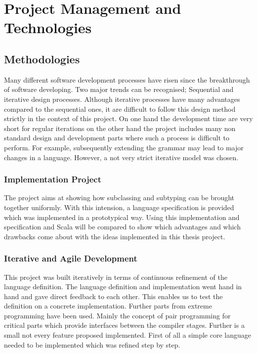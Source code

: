\chapter{Project Management and Technologies}
\label{ctr:projectManagement}
\section{Methodologies}
Many different software development processes have risen since the
breakthrough of software developing. Two major trends can be recognised;
Sequential and iterative design processes. Although iterative processes
have many advantages compared to the sequential ones, it are difficult to follow
this design method strictly in the context of this project. On one
hand the development time are very short for regular iterations on the
other hand the project includes many non standard design and development
parts where such a process is difficult to perform. For example,
subsequently extending the grammar may lead to major changes in a language. However,
a not very strict iterative model was chosen.

\subsection{Implementation Project}
The project aims at showing how subclassing and subtyping can be brought
together uniformly. With this intension, a language specification is provided which
was implemented in a prototypical way. Using this implementation and
specification \ooplss and Scala will be compared to
show which advantages and which drawbacks come about with the ideas implemented
in this thesis project.

\subsection{Iterative and Agile Development}
This project was built iteratively in terms of continuous refinement
of the language definition. The language definition and implementation
went hand in hand and gave direct feedback to each other. This enables us
to test the definition on a concrete implementation. Further parts from
extreme programming have been used. Mainly the concept of pair programming
for critical parts which provide interfaces between the compiler
stages. Further is a small not every feature proposed implemented.
First of all a simple core language needed to be implemented which was
refined step by step.

